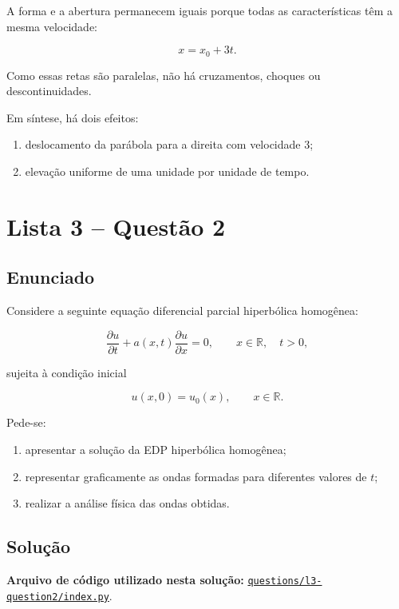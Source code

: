 \documentclass[
    12pt,
    oneside,
    a4paper,
    english,
    brazilian,
    chapter=TITLE,
    sumario=tradicional
]{abntex2}
\newcommand{\linkcodigo}[2]{%
    \par\noindent\textbf{Arquivo de código utilizado nesta solução: }
    \href{#1}{\nolinkurl{#2}}.\par
}
\begin{document}
A forma e a abertura permanecem iguais porque todas as características têm a
mesma velocidade:

\[
    x=x_0+3t.
\]

Como essas retas são paralelas, não há cruzamentos, choques ou
descontinuidades.

Em síntese, há dois efeitos:

\begin{enumerate}
    \item deslocamento da parábola para a direita com velocidade $3$;
    \item elevação uniforme de uma unidade por unidade de tempo.
\end{enumerate}
\fi

\newpage

\chapter{Lista 3 -- Questão 2}

\section{Enunciado}

Considere a seguinte equação diferencial parcial hiperbólica homogênea:

\[
    \frac{\partial u}{\partial t}
    +
    a(x,t)\frac{\partial u}{\partial x}
    =
    0,
    \qquad x\in\mathbb{R}, \quad t>0,
\]

sujeita à condição inicial

\[
    u(x,0)=u_0(x),
    \qquad x\in\mathbb{R}.
\]

Pede-se:

\begin{enumerate}
    \item apresentar a solução da EDP hiperbólica homogênea;
    \item representar graficamente as ondas formadas para diferentes valores de $t$;
    \item realizar a análise física das ondas obtidas.
\end{enumerate}

\section{Solução}

\linkcodigo
{https://github.com/kauanpecanha/Faculdade/blob/master/MEDO2/trabalho1/questions/l3-question2/index.py}
{questions/l3-question2/index.py}
\end{document}
